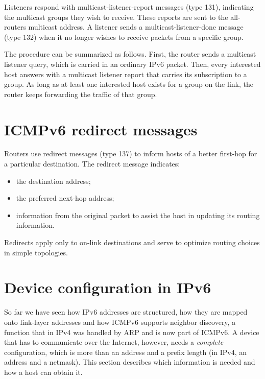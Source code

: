 Listeners respond with multicast-listener-report messages (type 131), indicating the multicast groups they wish to receive. These reports are sent to the all-routers multicast address. A listener sends a multicast-listener-done message (type 132) when it no longer wishes to receive packets from a specific group.

The procedure can be summarized as follows. First, the router sends a multicast
listener query, which is carried in an ordinary IPv6 packet. Then, every
interested host answers with a multicast listener report that carries its
subscription to a group. As long as at least one interested host exists for a
group on the link, the router keeps forwarding the traffic of that group.

\section{ICMPv6 redirect messages}

Routers use redirect messages (type 137) to inform hosts of a better first-hop for a particular destination. The redirect message indicates:

\begin{itemize}
\item the destination address;
\item the preferred next-hop address;
\item information from the original packet to assist the host in updating its routing information.
\end{itemize}

Redirects apply only to on-link destinations and serve to optimize routing choices in simple topologies.

\begin{center}
\end{center}

\begin{center}
\end{center}

\section{Device configuration in IPv6}

So far we have seen how IPv6 addresses are structured, how they are mapped onto link-layer addresses and how ICMPv6 supports neighbor discovery, a function that in IPv4 was handled by ARP and is now part of ICMPv6. A device that has to communicate over the Internet, however, needs a \emph{complete} configuration, which is more than an address and a prefix length (in IPv4, an address and a netmask). This section describes which information is needed and how a host can obtain it.

